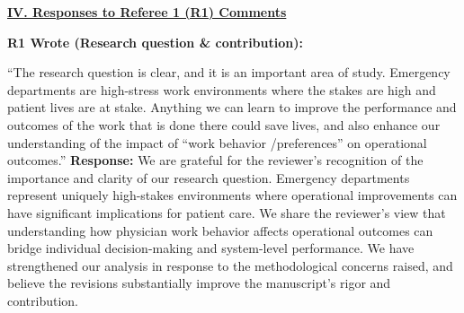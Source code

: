 \documentclass[11pt]{article}
\newenvironment{quote2}
{ \bigskip
\noindent
         \small\em
         \baselineskip=14pt
}
\newcommand{\1}{\hbox{\rm 1\kern-.35em 1}}
\begin{document}
\noindent\underline{\textbf{IV. Responses to Referee 1 (R1) Comments}}

\begin{quote2}
\textbf{R1 Wrote (Research question \& contribution):}  

\noindent``The research question is clear, and it is an important area of study. Emergency departments are high-stress work environments where the stakes are high and patient lives are at stake. Anything we can learn to improve the performance and outcomes of the work that is done there could save lives, and also enhance our understanding of the impact of ``work behavior /preferences'' on operational outcomes.'' 
\end{quote2}

\noindent\textbf{Response:} \color{blue}We are grateful for the reviewer's recognition of the importance and clarity of our research question. Emergency departments represent uniquely high-stakes environments where operational improvements can have significant implications for patient care. We share the reviewer's view that understanding how physician work behavior affects operational outcomes can bridge individual decision-making and system-level performance. We have strengthened our analysis in response to the methodological concerns raised, and believe the revisions substantially improve the manuscript's rigor and contribution.
\color{black}
\end{document}
